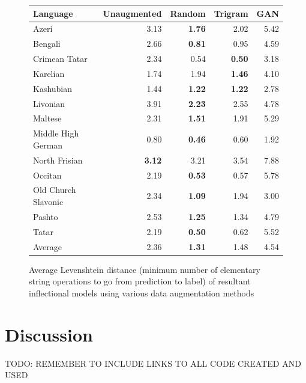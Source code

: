 \documentclass{article}
\begin{document}
      \begin{figure}[H]
        \center
        \begin{tabular}{lrrrr}
          \toprule
          Language & Unaugmented & Random & Trigram & GAN \\
          \midrule
          Azeri & 3.13 & \textbf{1.76} & 2.02 & 5.42 \\
          Bengali & 2.66 & \textbf{0.81} & 0.95 & 4.59 \\
          Crimean Tatar & 2.34 & 0.54 & \textbf{0.50} & 3.18 \\
          Karelian & 1.74 & 1.94 & \textbf{1.46} & 4.10 \\
          Kashubian & 1.44 & \textbf{1.22} & \textbf{1.22} & 2.78 \\
          Livonian & 3.91 & \textbf{2.23} & 2.55 & 4.78 \\
          Maltese & 2.31 & \textbf{1.51} & 1.91 & 5.29 \\
          Middle High German & 0.80 & \textbf{0.46} & 0.60 & 1.92 \\
          North Frisian & \textbf{3.12} & 3.21 & 3.54 & 7.88 \\
          Occitan & 2.19 & \textbf{0.53} & 0.57 & 5.78 \\
          Old Church Slavonic & 2.34 & \textbf{1.09} & 1.94 & 3.00 \\
          Pashto & 2.53 & \textbf{1.25} & 1.34 & 4.79\\
          Tatar & 2.19 & \textbf{0.50} & 0.62 & 5.52\\
          \midrule
          Average & 2.36 & \textbf{1.31} & 1.48 & 4.54\\
          \bottomrule
        \end{tabular}
        \caption{Average Levenshtein distance (minimum number of elementary string operations to go from prediction to label) of resultant inflectional models using various data augmentation methods}
        \label{fig:lev}
      \end{figure}
  \section{Discussion}

  TODO: REMEMBER TO INCLUDE LINKS TO ALL CODE CREATED AND USED
  
\end{document}
